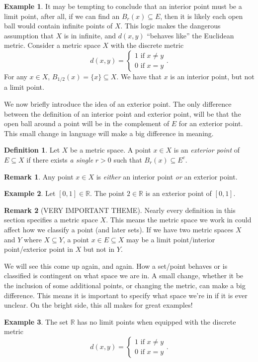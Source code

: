 \documentclass{article}
\newcommand{\R}{\mathbb{R}}
\theoremstyle{definition}
\newtheorem{definition}{Definition}[section]
\newtheorem{example}{Example}[section]
\newtheorem{remark}{Remark}[section]
\begin{document}
	\begin{example}
		It may be tempting to conclude that an interior point must be a limit point, after all, if we can find an $ B_r(x)\subseteq E $, then it is likely each open ball would contain infinite points of $ X $. This logic makes the dangerous assumption that $ X $ is in infinite, and $ d(x,y) $ ``behaves like'' the Euclidean metric. Consider a metric space $ X $ with the discrete metric $$ d(x,y)=\begin{cases}
			1\text{ if }x\neq y\\
			0\text{ if }x=y
		\end{cases}.$$ 
		For any $ x\in X $, $ B_{1/2}(x)=\{x\}\subseteq X $. We have that $ x $ is an interior point, but not a limit point. 
	\end{example}
	We now briefly introduce the idea of an exterior point. The only difference between the  definition of an interior point and exterior point, will be that the open ball around a point will be in the complement of $ E $ for an exterior point. This small change in language will make a big difference in meaning. 
	\begin{definition}\label{def2.9}
		Let $ X $ be a metric space. A point $ x\in X$ is an \textit{\color{red}exterior point} of $ E\subseteq X $ if there exists \textit{a single} $ r>0 $ such that $ B_r(x)\subseteq E^c $.
	\end{definition}
	\begin{remark}
		Any point $ x\in X $ is \textit{either} an interior point \textit{or} an exterior point.
	\end{remark}
	\begin{example}
		Let $ [0,1]\in \R $. The point $ 2\in\R $ is an exterior point of $ [0,1] $. 
	\end{example} 
	\begin{remark}[VERY IMPORTANT THEME]
		Nearly every definition in this section specifies a metric space $ X $. This means the metric space we work in could affect how we classify a point (and later sets). If we have two metric spaces $ X $ and $ Y $ where $ X\subseteq Y $, a point $ x\in E\subseteq X $ may be a limit point/interior point/exterior point in $ X $ but not in $ Y $. 
		
		We will see this come up again, and again. How a set/point behaves or is classified is contingent on what space we are in. A small change, whether it be the inclusion of some additional points, or changing the metric, can make a big difference. This means it is important to specify what space we're in if it is ever unclear. On the bright side, this all makes for great examples!   
	\end{remark}
	\begin{example}
		The set $ \R $ has no limit points when equipped with the discrete metric $$ d(x,y)=\begin{cases}
			1\text{ if }x\neq y\\
			0\text{ if }x=y
		\end{cases}.$$  
		
	\end{example}
	
\end{document}
